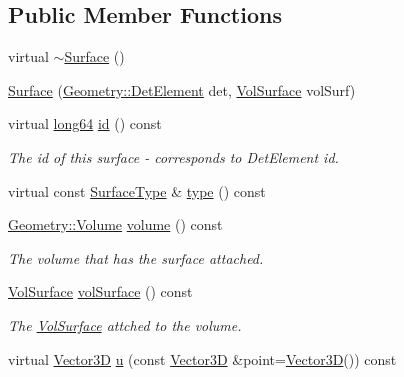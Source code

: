 \subsection*{Public Member Functions}
\begin{DoxyCompactItemize}
\item 
virtual \hyperlink{class_d_d4hep_1_1_d_d_rec_1_1_surface_aa336356bfc2c272c65b7fae46688dad5}{$\sim$Surface} ()
\item 
\hyperlink{class_d_d4hep_1_1_d_d_rec_1_1_surface_a1a4cca5bac129f897331f1df355c75d0}{Surface} (\hyperlink{class_d_d4hep_1_1_geometry_1_1_det_element}{Geometry::DetElement} det, \hyperlink{class_d_d4hep_1_1_d_d_rec_1_1_vol_surface}{VolSurface} volSurf)
\item 
virtual \hyperlink{namespace_d_d4hep_ac2a70e722b33dc7ddaa20db8954ac836}{long64} \hyperlink{class_d_d4hep_1_1_d_d_rec_1_1_surface_a563f289fbf049099a6bd37433d853a53}{id} () const 
\begin{DoxyCompactList}\small\item\em The id of this surface -\/ corresponds to DetElement id. \item\end{DoxyCompactList}\item 
virtual const \hyperlink{class_d_d_surfaces_1_1_surface_type}{SurfaceType} \& \hyperlink{class_d_d4hep_1_1_d_d_rec_1_1_surface_ac2500033e175992484aba8956a27bdd6}{type} () const 
\item 
\hyperlink{class_d_d4hep_1_1_geometry_1_1_volume}{Geometry::Volume} \hyperlink{class_d_d4hep_1_1_d_d_rec_1_1_surface_a503e338d4d10ef0826b59004e6978d43}{volume} () const 
\begin{DoxyCompactList}\small\item\em The volume that has the surface attached. \item\end{DoxyCompactList}\item 
\hyperlink{class_d_d4hep_1_1_d_d_rec_1_1_vol_surface}{VolSurface} \hyperlink{class_d_d4hep_1_1_d_d_rec_1_1_surface_a4aa8b91c65fcda2f0ce817294d6e127d}{volSurface} () const 
\begin{DoxyCompactList}\small\item\em The \hyperlink{class_d_d4hep_1_1_d_d_rec_1_1_vol_surface}{VolSurface} attched to the volume. \item\end{DoxyCompactList}\item 
virtual \hyperlink{class_d_d_surfaces_1_1_vector3_d}{Vector3D} \hyperlink{class_d_d4hep_1_1_d_d_rec_1_1_surface_af08e3ae0be217b8bc54d9a447a66be03}{u} (const \hyperlink{class_d_d_surfaces_1_1_vector3_d}{Vector3D} \&point=\hyperlink{class_d_d_surfaces_1_1_vector3_d}{Vector3D}()) const 

\end{DoxyCompactItemize}
